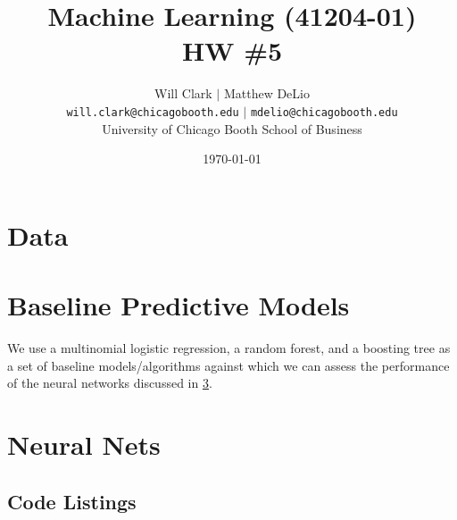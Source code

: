 



\title{Machine Learning (41204-01)\\HW \#5}
\author{Will Clark $\vert$ Matthew DeLio \\
\texttt{will.clark@chicagobooth.edu} $\vert$ \texttt{mdelio@chicagobooth.edu} \\
University of Chicago Booth School of Business}
\date{\today}
\maketitle

\section{Data}

\section{Baseline Predictive Models} \label{baseline}

We use a multinomial logistic regression, a random forest, and a boosting tree as a set of baseline models/algorithms against which we can assess the performance of the neural networks discussed in \cref{nnets}.

\section{Neural Nets} \label{nnets}




\clearpage
\begin{appendices}
\section{Code Listings}

\end{appendices}



% 



